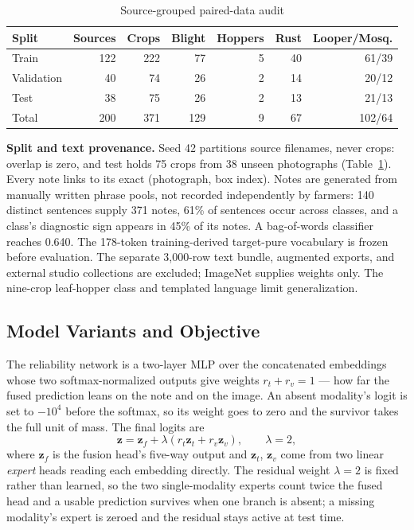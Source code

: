 \documentclass[conference]{IEEEtran}
\begin{document}
\begin{table}[t]
\caption{Source-grouped paired-data audit}
\label{tab:dataaudit}
\centering\footnotesize
\setlength\tabcolsep{2.8pt}
\begin{tabular}{lrrrrrr}
\toprule
\textbf{Split} & \textbf{Sources} & \textbf{Crops} & \textbf{Blight} &
\textbf{Hoppers} & \textbf{Rust} & \textbf{Looper/Mosq.}\\
\midrule
Train      & 122 & 222 & 77 & 5 & 40 & 61/39\\
Validation & 40  & 74  & 26 & 2 & 14 & 20/12\\
Test       & 38  & 75  & 26 & 2 & 13 & 21/13\\
\midrule
Total      & 200 & 371 & 129 & 9 & 67 & 102/64\\
\bottomrule
\end{tabular}
\end{table}

\textbf{Split and text provenance.} Seed 42 partitions source filenames, never
crops: overlap is zero, and test holds 75 crops from 38 unseen photographs
(Table~\ref{tab:dataaudit}). Every note links to its exact (photograph, box
index). Notes are generated from manually written phrase pools, not recorded
independently by farmers: 140 distinct sentences supply 371 notes, 61\% of
sentences occur across classes, and a class's diagnostic sign appears in 45\%
of its notes. A bag-of-words classifier reaches 0.640. The 178-token
training-derived target-pure vocabulary is frozen before evaluation.
The separate 3,000-row text bundle, augmented exports, and external studio
collections are excluded; ImageNet supplies weights only. The nine-crop
leaf-hopper class and templated language limit generalization.

\subsection{Model Variants and Objective}
\label{sec:variants}

The reliability network is a two-layer MLP over the concatenated embeddings
whose two softmax-normalized outputs give weights $r_t+r_v=1$ --- how far the
fused prediction leans on the note and on the image. An absent modality's logit
is set to $-10^{4}$ before the softmax, so its weight goes to zero and the
survivor takes the full unit of mass. The final logits are
\begin{equation}
\mathbf{z}=\mathbf{z}_f+\lambda\left(r_t\mathbf{z}_t+r_v\mathbf{z}_v\right),\qquad\lambda=2,
\label{eq:logits}
\end{equation}
where $\mathbf{z}_f$ is the fusion head's five-way output and $\mathbf{z}_t$,
$\mathbf{z}_v$ come from two linear \emph{expert} heads reading each embedding
directly. The residual weight $\lambda=2$ is
fixed rather than learned, so the two single-modality experts count twice the
fused head and a usable prediction survives when one branch is absent; a
missing modality's expert is zeroed and the residual stays active at test time.
\end{document}
